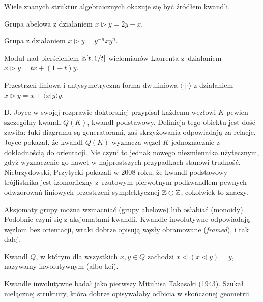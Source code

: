 Wiele znanych struktur algebraicznych okazuje się być źródłem kwandli.

\begin{example}
    Grupa abelowa z działaniem $x \triangleright y = 2y - x$.
\end{example}

\begin{example}
    Grupa z działaniem $x \triangleright y = y^{-n} x y^n$.
\end{example}

\begin{example}
    Moduł nad pierścieniem $\mathbb Z[t, 1/t]$ wielomianów Laurenta z~działaniem $x \triangleright y =tx + (1-t) y$.
\end{example}

\begin{example}
    Przestrzeń liniowa i antysymetryczna forma dwuliniowa $\langle \cdot | \cdot \rangle$ z działaniem $x \triangleright y = x + \langle x | y \rangle y$.
\end{example}

D. Joyce w swojej rozprawie doktorskiej przypisał każdemu węzłowi $K$ pewien szczególny kwandl $Q(K)$, kwandl podstawowy.
Definicja tego obiektu jest dość zawiła: łuki diagramu są generatorami, zaś skrzyżowania odpowiadają za relacje.
Joyce pokazał, że kwandl $Q(K)$ wyznacza węzeł $K$ jednoznacznie z dokładnością do orientacji.
Nie czyni to jednak nowego niezmiennika użytecznym, gdyż wyznaczenie go nawet w najprostszych przypadkach stanowi trudność.
Niebrzydowski, Przytycki pokazali w 2008 roku, że kwandl podstawowy trójlistnika jest izomorficzny z~rzutowym pierwotnym podkwandlem pewnych odwzorowań liniowych przestrzeni symplektycznej $\mathbb Z \oplus \mathbb Z$, cokolwiek to znaczy.

Aksjomaty grupy można wzmacniać (grupy abelowe) lub osłabiać (monoidy).
Podobnie czyni się z aksjomatami kwandli.
Kwandle inwolutywne odpowiadają węzłom bez orientacji, wraki dobrze opisują węzły obramowane (\emph{framed}), i tak dalej.

\begin{definition}
    Kwandl $Q$, w którym dla wszystkich $x, y \in Q$ zachodzi $x \triangleleft (x \triangleleft y) = y$, nazywamy inwolutywnym (albo kei).
\end{definition}

Kwandle inwolutywne badał jako pierwszy Mituhisa Takasaki (1943).
Szukał niełącznej struktury, która dobrze opisywałaby odbicia w skończonej geometrii.

